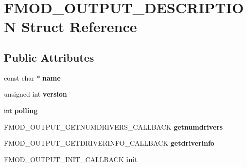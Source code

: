 \hypertarget{struct_f_m_o_d___o_u_t_p_u_t___d_e_s_c_r_i_p_t_i_o_n}{\section{F\+M\+O\+D\+\_\+\+O\+U\+T\+P\+U\+T\+\_\+\+D\+E\+S\+C\+R\+I\+P\+T\+I\+O\+N Struct Reference}
\label{struct_f_m_o_d___o_u_t_p_u_t___d_e_s_c_r_i_p_t_i_o_n}
}
\subsection*{Public Attributes}
\begin{DoxyCompactItemize}
\item 
\hypertarget{struct_f_m_o_d___o_u_t_p_u_t___d_e_s_c_r_i_p_t_i_o_n_a485fd85448a97e6762c535ec8b88f22a}{const char $\ast$ {\bfseries name}}\label{struct_f_m_o_d___o_u_t_p_u_t___d_e_s_c_r_i_p_t_i_o_n_a485fd85448a97e6762c535ec8b88f22a}

\item 
\hypertarget{struct_f_m_o_d___o_u_t_p_u_t___d_e_s_c_r_i_p_t_i_o_n_a1ffa1ceb39e6b22a0887819f479cbdd9}{unsigned int {\bfseries version}}\label{struct_f_m_o_d___o_u_t_p_u_t___d_e_s_c_r_i_p_t_i_o_n_a1ffa1ceb39e6b22a0887819f479cbdd9}

\item 
\hypertarget{struct_f_m_o_d___o_u_t_p_u_t___d_e_s_c_r_i_p_t_i_o_n_a523fa9268311d2f39464bc0d8bdacf53}{int {\bfseries polling}}\label{struct_f_m_o_d___o_u_t_p_u_t___d_e_s_c_r_i_p_t_i_o_n_a523fa9268311d2f39464bc0d8bdacf53}

\item 
\hypertarget{struct_f_m_o_d___o_u_t_p_u_t___d_e_s_c_r_i_p_t_i_o_n_a65a9a7d1b963ff0bf16fe0937bb50f69}{F\+M\+O\+D\+\_\+\+O\+U\+T\+P\+U\+T\+\_\+\+G\+E\+T\+N\+U\+M\+D\+R\+I\+V\+E\+R\+S\+\_\+\+C\+A\+L\+L\+B\+A\+C\+K {\bfseries getnumdrivers}}\label{struct_f_m_o_d___o_u_t_p_u_t___d_e_s_c_r_i_p_t_i_o_n_a65a9a7d1b963ff0bf16fe0937bb50f69}

\item 
\hypertarget{struct_f_m_o_d___o_u_t_p_u_t___d_e_s_c_r_i_p_t_i_o_n_a83a93f62be3425e54992623c32a15417}{F\+M\+O\+D\+\_\+\+O\+U\+T\+P\+U\+T\+\_\+\+G\+E\+T\+D\+R\+I\+V\+E\+R\+I\+N\+F\+O\+\_\+\+C\+A\+L\+L\+B\+A\+C\+K {\bfseries getdriverinfo}}\label{struct_f_m_o_d___o_u_t_p_u_t___d_e_s_c_r_i_p_t_i_o_n_a83a93f62be3425e54992623c32a15417}

\item 
\hypertarget{struct_f_m_o_d___o_u_t_p_u_t___d_e_s_c_r_i_p_t_i_o_n_a985b9b14d82739abeee0eec8e0ae8a11}{F\+M\+O\+D\+\_\+\+O\+U\+T\+P\+U\+T\+\_\+\+I\+N\+I\+T\+\_\+\+C\+A\+L\+L\+B\+A\+C\+K {\bfseries init}}\label{struct_f_m_o_d___o_u_t_p_u_t___d_e_s_c_r_i_p_t_i_o_n_a985b9b14d82739abeee0eec8e0ae8a11}


\end{DoxyCompactItemize}
